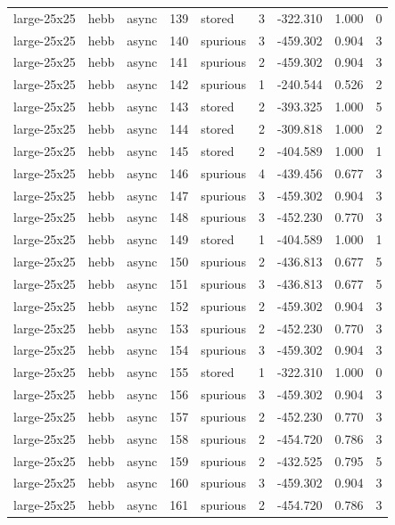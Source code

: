 \begin{tabular}{lllrlrrrr}
large-25x25 & hebb & async & 139 & stored & 3 & -322.310 & 1.000 & 0 \\
large-25x25 & hebb & async & 140 & spurious & 3 & -459.302 & 0.904 & 3 \\
large-25x25 & hebb & async & 141 & spurious & 2 & -459.302 & 0.904 & 3 \\
large-25x25 & hebb & async & 142 & spurious & 1 & -240.544 & 0.526 & 2 \\
large-25x25 & hebb & async & 143 & stored & 2 & -393.325 & 1.000 & 5 \\
large-25x25 & hebb & async & 144 & stored & 2 & -309.818 & 1.000 & 2 \\
large-25x25 & hebb & async & 145 & stored & 2 & -404.589 & 1.000 & 1 \\
large-25x25 & hebb & async & 146 & spurious & 4 & -439.456 & 0.677 & 3 \\
large-25x25 & hebb & async & 147 & spurious & 3 & -459.302 & 0.904 & 3 \\
large-25x25 & hebb & async & 148 & spurious & 3 & -452.230 & 0.770 & 3 \\
large-25x25 & hebb & async & 149 & stored & 1 & -404.589 & 1.000 & 1 \\
large-25x25 & hebb & async & 150 & spurious & 2 & -436.813 & 0.677 & 5 \\
large-25x25 & hebb & async & 151 & spurious & 3 & -436.813 & 0.677 & 5 \\
large-25x25 & hebb & async & 152 & spurious & 2 & -459.302 & 0.904 & 3 \\
large-25x25 & hebb & async & 153 & spurious & 2 & -452.230 & 0.770 & 3 \\
large-25x25 & hebb & async & 154 & spurious & 3 & -459.302 & 0.904 & 3 \\
large-25x25 & hebb & async & 155 & stored & 1 & -322.310 & 1.000 & 0 \\
large-25x25 & hebb & async & 156 & spurious & 3 & -459.302 & 0.904 & 3 \\
large-25x25 & hebb & async & 157 & spurious & 2 & -452.230 & 0.770 & 3 \\
large-25x25 & hebb & async & 158 & spurious & 2 & -454.720 & 0.786 & 3 \\
large-25x25 & hebb & async & 159 & spurious & 2 & -432.525 & 0.795 & 5 \\
large-25x25 & hebb & async & 160 & spurious & 3 & -459.302 & 0.904 & 3 \\
large-25x25 & hebb & async & 161 & spurious & 2 & -454.720 & 0.786 & 3 \\

\end{tabular}
